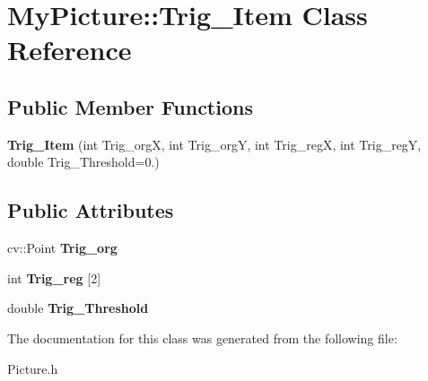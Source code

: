 \hypertarget{class_my_picture_1_1_trig___item}{}\section{My\+Picture\+:\+:Trig\+\_\+\+Item Class Reference}
\label{class_my_picture_1_1_trig___item}
\subsection*{Public Member Functions}
\begin{DoxyCompactItemize}
\item 
\mbox{\label{class_my_picture_1_1_trig___item_a6c267e2152764976636b047d19fc4e38}} 
{\bfseries Trig\+\_\+\+Item} (int Trig\+\_\+orgX, int Trig\+\_\+orgY, int Trig\+\_\+regX, int Trig\+\_\+regY, double Trig\+\_\+\+Threshold=0.)
\end{DoxyCompactItemize}
\subsection*{Public Attributes}
\begin{DoxyCompactItemize}
\item 
\mbox{\label{class_my_picture_1_1_trig___item_a4b0558164c057b5961e090ec171963d0}} 
cv\+::\+Point {\bfseries Trig\+\_\+org}
\item 
\mbox{\label{class_my_picture_1_1_trig___item_abaf934286bd512e4ce65b622ac931e32}} 
int {\bfseries Trig\+\_\+reg} \mbox{[}2\mbox{]}
\item 
\mbox{\label{class_my_picture_1_1_trig___item_a26ba7d2deea4ce2b82fb1b6c7e1c85b1}} 
double {\bfseries Trig\+\_\+\+Threshold}
\end{DoxyCompactItemize}


The documentation for this class was generated from the following file\+:\begin{DoxyCompactItemize}
\item 
Picture.\+h\end{DoxyCompactItemize}

